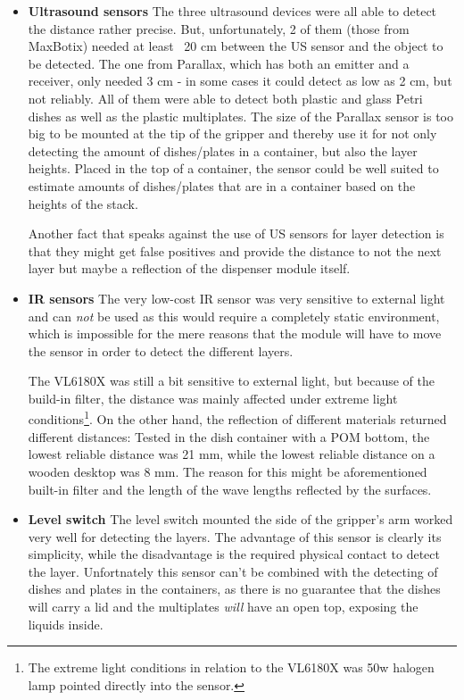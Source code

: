\documentclass[10pt,a4paper]{article}
\begin{document}
		\begin{itemize}
			\item \textbf{Ultrasound sensors} The three ultrasound devices were all able to detect the distance rather precise. But, unfortunately, 2 of them (those from MaxBotix) needed at least ~20 cm between the US sensor and the object to be detected. The one from Parallax, which has both an emitter and a receiver, only needed 3 cm - in some cases it could detect as low as 2 cm, but not reliably. All of them were able to detect both plastic and glass Petri dishes as well as the plastic multiplates. The size of the Parallax sensor is too big to be mounted at the tip of the gripper and thereby use it for not only detecting the amount of dishes/plates in a container, but also the layer heights. Placed in the top of a container, the sensor could be well suited to estimate amounts of dishes/plates that are in a container based on the heights of the stack.
			
			Another fact that speaks against the use of US sensors for layer detection is that they might get false positives and provide the distance to not the next layer but maybe a reflection of the dispenser module itself. 		
			
			\item \textbf{IR sensors} The very low-cost IR sensor was very sensitive to external light and can \textit{not} be used as this would require a completely static environment, which is impossible for the mere reasons that the module will have to move the sensor in order to detect the different layers.
			
			The VL6180X was still a bit sensitive to external light, but because of the build-in filter, the distance was mainly affected under extreme light conditions\footnote{The extreme light conditions in relation to the VL6180X was 50w halogen lamp pointed directly into the sensor.}. On the other hand, the reflection of different materials returned different distances: Tested in the dish container with a POM bottom, the lowest reliable distance was 21 mm, while the lowest reliable distance on a wooden desktop was 8 mm. The reason for this might be aforementioned built-in filter and the length of the wave lengths reflected by the surfaces.
			
			\item \textbf{Level switch} The level switch mounted the side of the gripper's arm worked very well for detecting the layers. The advantage of this sensor is clearly its simplicity, while the disadvantage is the required physical contact to detect the layer. Unfortnately this sensor can't be combined with the detecting of dishes and plates in the containers, as there is no guarantee that the dishes will carry a lid and the multiplates \textit{will} have an open top, exposing the liquids inside.
			

\end{itemize}
\end{document}
